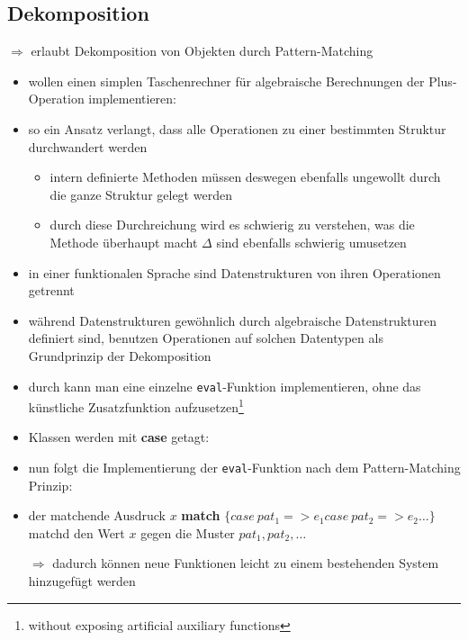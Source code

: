 

\subsection{Dekomposition}
$\Rightarrow$ erlaubt Dekomposition von Objekten durch Pattern-Matching




\begin{itemize}
  \item wollen einen simplen Taschenrechner für algebraische Berechnungen \und 
  der Plus-Operation implementieren:
  
  
  
  \item so ein Ansatz verlangt, dass alle Operationen zu einer bestimmten
  Struktur durchwandert werden
  
  \begin{itemize}
    \item intern definierte Methoden müssen deswegen ebenfalls ungewollt
    durch die ganze Struktur gelegt werden
    \item durch diese Durchreichung wird es schwierig zu verstehen, was
    die Methode überhaupt macht \und $\Delta$ sind ebenfalls schwierig
    umusetzen
  \end{itemize}
\end{itemize}




\begin{itemize}
  \item in einer funktionalen Sprache sind Datenstrukturen von ihren Operationen
  getrennt  
  \item während Datenstrukturen gewöhnlich durch algebraische Datenstrukturen
  definiert sind, benutzen Operationen auf solchen Datentypen 
   als Grundprinzip der Dekomposition
  \item durch  kann man eine einzelne 
  \texttt{eval}-Funktion implementieren, ohne das künstliche Zusatzfunktion
  aufzusetzen\footnote{without exposing artificial auxiliary functions} 
  \item Klassen werden mit \textbf{case} getagt:
  
  
  \item nun folgt die Implementierung der \texttt{eval}-Funktion nach dem
  Pattern-Matching Prinzip:
  
  
  
  \item der matchende Ausdruck $x$ \textbf{match} $\{ case\: pat_1 => e_1
  case\: pat_2 => e_2 \ldots \}$ matchd den Wert $x$ gegen die Muster $pat_1, 
  pat_2, \ldots$
  
  
  $\Rightarrow$ dadurch können neue Funktionen leicht zu einem bestehenden
  System hinzugefügt werden
\end{itemize}


